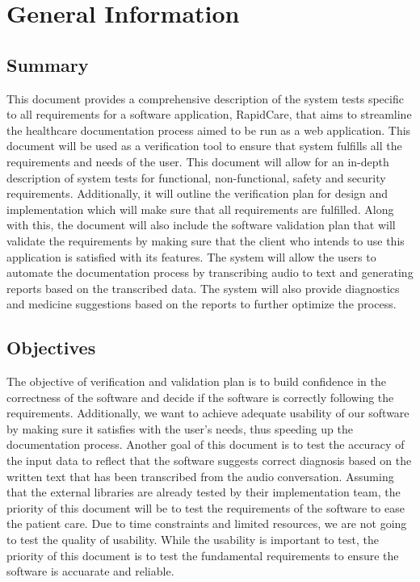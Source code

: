 \documentclass[12pt, titlepage]{article}
\begin{document}

\newpage


\section{General Information} \label{section:2}

\subsection{Summary} \label{section:2.1}

This document provides a comprehensive description of the system tests specific to all requirements for a software application, RapidCare, that aims to streamline the healthcare documentation process aimed to be run as a web application. This document will be used as a verification tool to ensure that system fulfills all the requirements and needs of the user. This document will allow for an in-depth description of system tests for functional, non-functional, safety and security requirements. Additionally, it will outline the verification plan for design and implementation which will make sure that all requirements are fulfilled. Along with this, the document will also include the software validation plan that will validate the requirements by making sure that the client who intends to use this application is satisfied with its features. The system will allow the users to automate the documentation process by transcribing audio to text and generating reports based on the transcribed data. The system will also provide diagnostics and medicine suggestions based on the reports to further optimize the process.    

\subsection{Objectives} \label{section:2.2}

The objective of verification and validation plan is to build confidence in the correctness of the software and decide if the software is correctly following the requirements. Additionally, we want to achieve adequate usability of our software by making sure it satisfies with the user's needs, thus speeding up the documentation process. Another goal of this document is to test the accuracy of the input data to reflect that the software suggests correct diagnosis based on the written text that has been transcribed from the audio conversation. Assuming that the external libraries are already tested by their implementation team, the priority of this document will be to test the requirements of the software to ease the patient care. Due to time constraints and limited resources, we are not going to test the quality of usability. While the usability is important to test, the priority of this document is to test the fundamental requirements to ensure the software is accuarate and reliable. 
\end{document}
